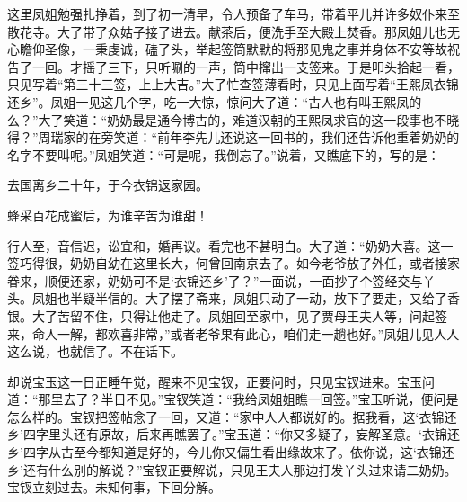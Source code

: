 \begin{parag}
    这里凤姐勉强扎挣着，到了初一清早，令人预备了车马，带着平儿并许多奴仆来至散花寺。大了带了众姑子接了进去。献茶后，便洗手至大殿上焚香。那凤姐儿也无心瞻仰圣像，一秉虔诚，磕了头，举起签筒默默的将那见鬼之事并身体不安等故祝告了一回。才摇了三下，只听唰的一声，筒中撺出一支签来。于是叩头拾起一看，只见写着“第三十三签，上上大吉。”大了忙查签薄看时，只见上面写着“王熙凤衣锦还乡”。凤姐一见这几个字，吃一大惊，惊问大了道：“古人也有叫王熙凤的么？”大了笑道：“奶奶最是通今博古的，难道汉朝的王熙凤求官的这一段事也不晓得？”周瑞家的在旁笑道：“前年李先儿还说这一回书的，我们还告诉他重着奶奶的名字不要叫呢。”凤姐笑道：“可是呢，我倒忘了。”说着，又瞧底下的，写的是：
\end{parag}


\begin{poem}
    \begin{pl}
        去国离乡二十年，于今衣锦返家园。
    \end{pl}


    \begin{pl}
        蜂采百花成蜜后，为谁辛苦为谁甜！
    \end{pl}

\end{poem}


\begin{parag}
    行人至，音信迟，讼宜和，婚再议。看完也不甚明白。大了道：“奶奶大喜。这一签巧得很，奶奶自幼在这里长大，何曾回南京去了。如今老爷放了外任，或者接家眷来，顺便还家，奶奶可不是‘衣锦还乡’了？”一面说，一面抄了个签经交与丫头。凤姐也半疑半信的。大了摆了斋来，凤姐只动了一动，放下了要走，又给了香银。大了苦留不住，只得让他走了。凤姐回至家中，见了贾母王夫人等，问起签来，命人一解，都欢喜非常，”或者老爷果有此心，咱们走一趟也好。”凤姐儿见人人这么说，也就信了。不在话下。
\end{parag}


\begin{parag}
    却说宝玉这一日正睡午觉，醒来不见宝钗，正要问时，只见宝钗进来。宝玉问道：“那里去了？半日不见。”宝钗笑道：“我给凤姐姐瞧一回签。”宝玉听说，便问是怎么样的。宝钗把签帖念了一回，又道：“家中人人都说好的。据我看，这‘衣锦还乡’四字里头还有原故，后来再瞧罢了。”宝玉道：“你又多疑了，妄解圣意。‘衣锦还乡’四字从古至今都知道是好的，今儿你又偏生看出缘故来了。依你说，这‘衣锦还乡’还有什么别的解说？”宝钗正要解说，只见王夫人那边打发丫头过来请二奶奶。宝钗立刻过去。未知何事，下回分解。
\end{parag}